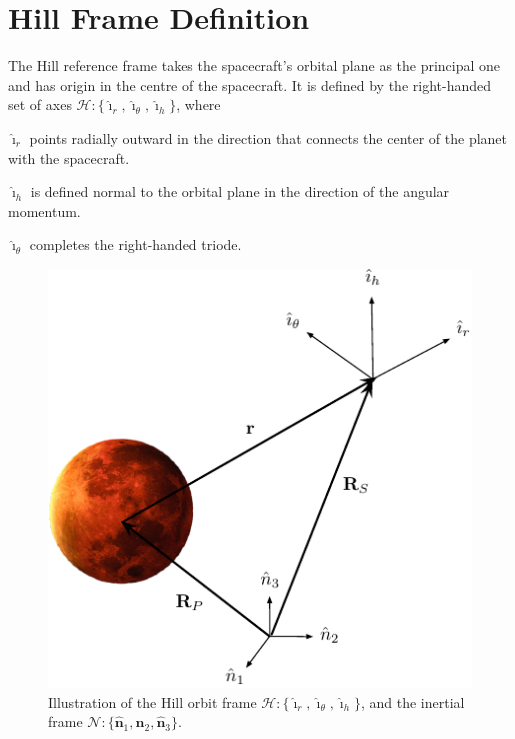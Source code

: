 \documentclass[]{AVSSimReportMemo}
\begin{document}
\section{Hill Frame Definition}
The Hill reference frame takes the spacecraft's orbital plane as the principal one and has origin in the centre of the spacecraft. It is defined by the right-handed set of axes $\mathcal{H}:\{ \hat{\bm\imath}_{r}, \hat{\bm\imath}_{\theta}, \hat{\bm\imath}_{h} \}$, where\par
$\hat {\bm\imath}_{r}$  points radially outward in the direction that connects the center of the planet with the spacecraft. \par
$\hat {\bm\imath}_{h}$ is defined normal to the orbital plane in the direction of the angular momentum. \par
$\hat {\bm\imath}_{\theta}$ completes the right-handed triode.
\begin{figure}[htb]
	\centerline{
	\includegraphics{Figures/Fig2}
	}
	\caption{Illustration of the Hill orbit frame $\mathcal{H}:\{ \hat{\bm\imath}_{r}, \hat{\bm\imath}_{\theta}, \hat{\bm\imath}_{h} \}$, and the inertial frame $\mathcal{N}:\{ \hat{\bm n}_{1}, \hat{\bm n}_{2}, \hat{\bm n}_{3} \}$.}
	\label{fig:Fig1}
\end{figure}
\end{document}
